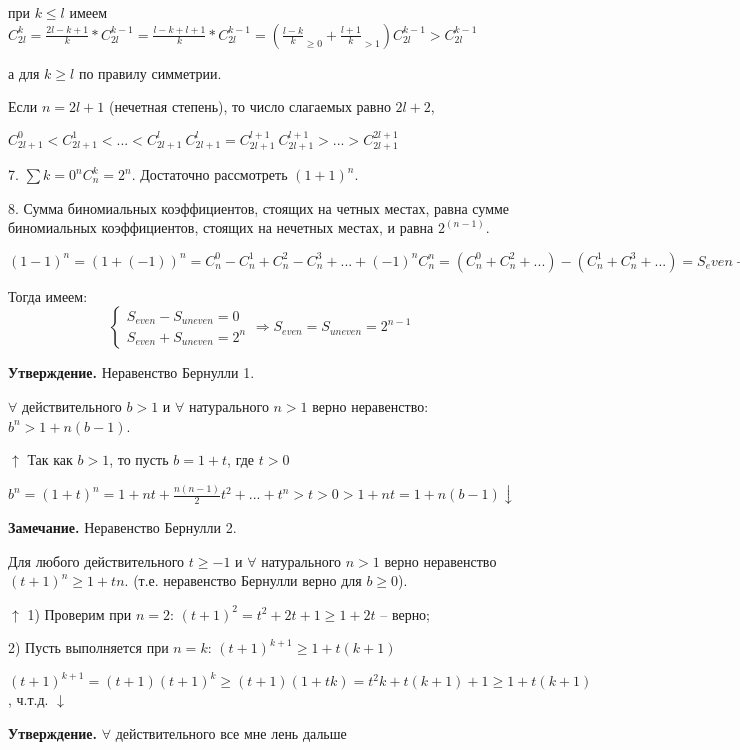 \documentclass{article}
\begin{document}
    при \(k \leq l\) имеем \(C_{2l}^k = \frac{2l - k + 1}{k} * C_{2l}^{k-1} = \frac{l - k + l + 1}{k} * C_{2l}^{k-1} = (\frac{l - k}{k}_{\geq 0} + \frac{l + 1}{k}_{> 1}) C_{2l}^{k-1} > C_{2l}^{k-1}\)

    а для \(k \geq l\) по правилу симметрии.

    Если \(n = 2l + 1\) (нечетная степень), то число слагаемых равно \(2l + 2\),

    \begin{center}
        \(C_{2l+1}^0 < C_{2l+1}^1 < ... < C_{2l+1}^l\ C_{2l+1}^l = C_{2l+1}^{l+1}\ C_{2l+1}^{l+1} > ... > C_{2l+1}^{2l+1}\)
    \end{center}

    7. \(\sum\limits{k=0}^n C_n^k = 2^n\). Достаточно рассмотреть \((1 + 1)^n\).

    8. Сумма биномиальных коэффициентов, стоящих на четных местах, равна сумме биномиальных коэффициентов, стоящих на нечетных местах, и равна \(2^(n-1)\).

    \((1 - 1)^n = (1 + (-1))^n = C_n^0 - C_n^1 + C_n^2 - C_n^3 + ... + (-1)^n C_n^n = (C_n^0 + C_n^2 + ...) - (C_n^1 + C_n^3 + ...) = S_even - S_uneven\)

    Тогда имеем:
    \begin{equation*}
        \begin{cases}
            S_{even} - S_{uneven} = 0
            \\
            S_{even} + S_{uneven} = 2^n
        \end{cases}
        \Rightarrow S_{even} = S_{uneven} = 2^{n-1}
    \end{equation*}

    \textbf{Утверждение.} Неравенство Бернулли 1.

    \(\forall\) действительного \(b > 1\) и \(\forall\) натурального \(n > 1\) верно неравенство: \(b^n > 1 + n(b - 1)\).

    \(\uparrow\) Так как \(b > 1\), то пусть \(b = 1 + t\), где \(t > 0\)

    \(b^n = (1 + t)^n = 1 + nt + \frac{n(n - 1)}{2} t^2 + ... + t^n > {t > 0} > 1 + nt = 1 + n(b - 1) \downarrow\)

    \textbf{Замечание.} Неравенство Бернулли 2.

    Для любого действительного \(t \geq -1\) и \(\forall\) натурального \(n > 1\) верно неравенство \((t + 1)^n \geq 1 + tn\). (т.е. неравенство Бернулли верно для \(b \geq 0\)).

    \(\uparrow\) 1) Проверим при \(n = 2\): \((t + 1)^2 = t^2 + 2t + 1 \geq 1 + 2t\) -- верно;

    2) Пусть выполняется при \(n = k\): \((t + 1)^{k+1} \geq 1 + t(k + 1)\)

    \((t + 1)^{k+1} = (t + 1)(t + 1)^k \geq (t + 1)(1 + tk) = t^2k + t(k + 1) + 1 \geq 1 + t(k + 1)\), ч.т.д. \(\downarrow\)

    \textbf{Утверждение.} \(\forall\) действительного все мне лень дальше
\end{document}
